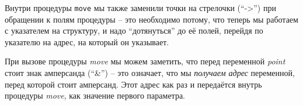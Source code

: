 \documentclass[../sparc.tex]{subfiles}
\begin{document}
Внутри процедуры \texttt{move} мы также заменили точки на стрелочки (``->'') при
обращении к полям процедуры -- это необходимо потому, что теперь мы работаем с
указателем на структуру, и надо ``дотянуться'' до её полей, перейдя по указателю
на адрес, на который он указывает.

При вызове процедуры \emph{move} мы можем заметить, что перед переменной
\emph{point} стоит знак амперсанда (``\&'') -- это означает, что мы
\emph{получаем адрес} переменной, перед которой стоит амперсанд.  Этот адрес как
раз и передаётся внутрь процедуры \emph{move}, как значение первого параметра.
\end{document}
